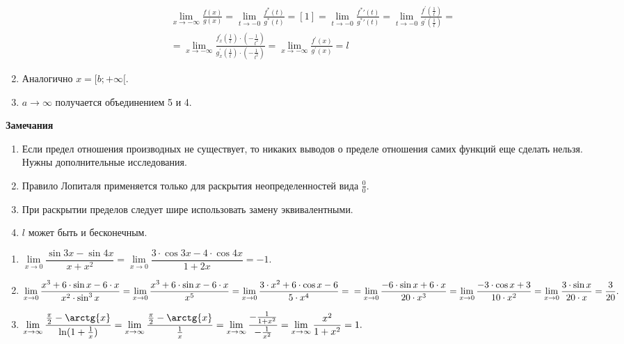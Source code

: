 \begin{Proof}
\begin{enumerate}
			\begin{multline*}
				\lim_{x \rightarrow -\infty}\frac{f(x)}{g(x)}=\lim_{t \rightarrow -0}\frac{f^*(t)}{g^*(t)}=[1]=\lim_{t \rightarrow -0}\frac{f^*\prime(t)}{g^*\prime(t)}=\lim_{t \rightarrow -0}\frac{f^\prime(\frac{1}{t})}{g^\prime(\frac{1}{t})}=\\=\lim_{x \rightarrow -\infty}\frac{f^\prime_{x}(\frac{1}{t})\cdot(-\frac{1}{t^2})}{g^\prime_{x}(\frac{1}{t})\cdot(-\frac{1}{t^2})}=\lim_{x \rightarrow -\infty}\frac{f^\prime(x)}{g^\prime(x)}=l
			\end{multline*}
			\item Аналогично $x=[b;+\infty[$.
			\item $a \rightarrow \infty$ получается объединением 5 и 4.
		\end{enumerate}
	\end{Proof}
	\textbf{Замечания}
	\begin{enumerate}
		\item Если предел отношения производных не существует, то никаких выводов о пределе отношения самих функций еще сделать нельзя. Нужны дополнительные исследования.
		\item Правило Лопиталя применяется только для раскрытия неопределенностей вида $\frac{0}{0}$.
		\item При раскрытии пределов следует шире использовать замену эквивалентными.
		\item $l$ может быть и бесконечным.
	\end{enumerate}
	\begin{example}
		\begin{enumerate}
			\item $\lim\limits_{x \rightarrow 0}\dfrac{\sin{3x}-\sin{4x}}{x+x^2}=\lim\limits_{x \rightarrow 0}\dfrac{3 \cdot \cos{3x} - 4 \cdot \cos{4x}}{1+2x}=-1.$
			\item $\lim\limits_{x \rightarrow 0}\dfrac{x^3+6 \cdot \sin{x} - 6 \cdot x}{x^2 \cdot \sin^3{x}}=\lim\limits_{x \rightarrow 0}\dfrac{x^3+6 \cdot \sin{x} - 6 \cdot x}{x^5}=\lim\limits_{x \rightarrow 0}\dfrac{3 \cdot x^2 + 6 \cdot \cos{x} - 6}{5 \cdot x^4}=\\\\=\lim\limits_{x \rightarrow 0}\dfrac{-6 \cdot \sin{x} + 6 \cdot x}{20 \cdot x^3}=\lim\limits_{x \rightarrow 0}\dfrac{-3 \cdot \cos{x}+3}{10\cdot x^2}=\lim\limits_{x \rightarrow 0}\dfrac{3 \cdot \sin{x}}{20 \cdot x}=\dfrac{3}{20}.$
			\item $\lim\limits_{x \rightarrow \infty}\dfrac{\frac{\pi}{2}-\arctg{x}}{\ln(1+\frac{1}{x})}=\lim\limits_{x \rightarrow \infty}\dfrac{\frac{\pi}{2}-\arctg{x}}{\frac{1}{x}}=\lim\limits_{x \rightarrow \infty}\dfrac{-\frac{1}{1+x^2}}{-\frac{1}{x^2}}=\lim\limits_{x \rightarrow \infty}\dfrac{x^2}{1+x^2}=1.$
		\end{enumerate}
	\end{example}
